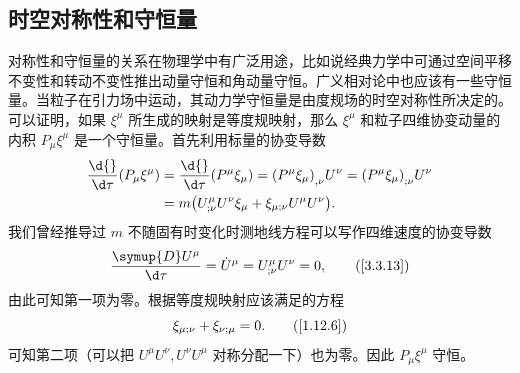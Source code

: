 \documentclass[UTF8, 12pt, a4paper, oneside, onecolumn, fontset=none]{ctexart}
\begin{document}
\subsection{时空对称性和守恒量}
对称性和守恒量的关系在物理学中有广泛用途，比如说经典力学中可通过空间平移不变性和转动不变性推出动量守恒和角动量守恒。广义相对论中也应该有一些守恒量。当粒子在引力场中运动，其动力学守恒量是由度规场的时空对称性所决定的。可以证明，如果 $\xi^{\mu}$ 所生成的映射是等度规映射，那么 $\xi^{\mu}$ 和粒子四维协变动量的内积 $P_{\mu}\xi^{\mu}$ 是一个守恒量。首先利用标量的协变导数
\begin{align}
\frac{\d{}}{\d\tau}\mleft(P_{\mu}\xi^{\mu}\mright)&=\frac{\d{}}{\d\tau}\mleft(P^{\mu}\xi_{\mu}\mright)=\mleft(P^{\mu}\xi_{\mu}\mright)_{,\nu}U^{\nu}=\mleft(P^{\mu}\xi_{\mu}\mright)_{;\nu}U^{\nu}\notag\\
&=m\mleft(U^{\mu}_{;\nu}U^{\nu}\xi_{\mu}+\xi_{\mu;\nu}U^{\mu}U^{\nu}\mright).
\end{align}
我们曾经推导过 $m$ 不随固有时变化时测地线方程可以写作四维速度的协变导数
\begin{equation}
\dfrac{\symup{D}U^{\mu}}{\d\tau}=\dot{U}^{\mu}=U^{\mu}_{;\nu}U^{\nu}=0,\tag{\ref{3.3.13}}
\end{equation}
由此可知第一项为零。根据等度规映射应该满足的方程
\begin{equation}
\xi_{\mu;\nu}+\xi_{\nu;\mu}=0.\tag{\ref{1.12.6}}
\end{equation}
可知第二项（可以把 $U^{\mu}U^{\nu}, U^{\nu}U^{\mu}$ 对称分配一下）也为零。因此 $P_{\mu}\xi^{\mu}$ 守恒。
\end{document}
